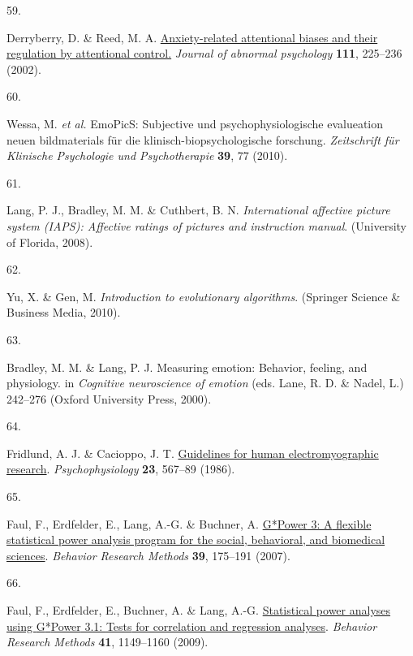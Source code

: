 \documentclass[
  man,floatsintext]{apa6}
\newlength{\cslhangindent}
\newlength{\csllabelwidth}
\newlength{\cslentryspacingunit} %
\newenvironment{CSLReferences}[2] %
 {%
  \setlength{\parindent}{0pt}
  \ifodd #1
  \let\oldpar\par
  \def\par{\hangindent=\cslhangindent\oldpar}
  \fi
  \setlength{\parskip}{#2\cslentryspacingunit}
 }%
 {}
\newcommand{\CSLLeftMargin}[1]{\parbox[t]{\csllabelwidth}{#1}}
\newcommand{\CSLRightInline}[1]{\parbox[t]{\linewidth - \csllabelwidth}{#1}\break}
\begin{document}
\begin{CSLReferences}{0}{0}
\leavevmode{}%
\CSLLeftMargin{59. }%
\CSLRightInline{Derryberry, D. \& Reed, M. A. \href{https://doi.org/10.1037//0021-843X.111.2.225}{Anxiety-related attentional biases and their regulation by attentional control.} \emph{Journal of abnormal psychology} \textbf{111}, 225--236 (2002).}

\leavevmode{}%
\CSLLeftMargin{60. }%
\CSLRightInline{Wessa, M. \emph{et al.} EmoPicS: Subjective und psychophysiologische evalueation neuen bildmaterials für die klinisch-biopsychologische forschung. \emph{Zeitschrift für Klinische Psychologie und Psychotherapie} \textbf{39}, 77 (2010).}

\leavevmode{}%
\CSLLeftMargin{61. }%
\CSLRightInline{Lang, P. J., Bradley, M. M. \& Cuthbert, B. N. \emph{International affective picture system (IAPS): Affective ratings of pictures and instruction manual}. (University of Florida, 2008).}

\leavevmode{}%
\CSLLeftMargin{62. }%
\CSLRightInline{Yu, X. \& Gen, M. \emph{Introduction to evolutionary algorithms}. (Springer Science \& Business Media, 2010).}

\leavevmode{}%
\CSLLeftMargin{63. }%
\CSLRightInline{Bradley, M. M. \& Lang, P. J. Measuring emotion: Behavior, feeling, and physiology. in \emph{Cognitive neuroscience of emotion} (eds. Lane, R. D. \& Nadel, L.) 242--276 (Oxford University Press, 2000).}

\leavevmode{}%
\CSLLeftMargin{64. }%
\CSLRightInline{Fridlund, A. J. \& Cacioppo, J. T. \href{https://doi.org/10.1111/j.1469-8986.1986.tb00676.x}{Guidelines for human electromyographic research}. \emph{Psychophysiology} \textbf{23}, 567--89 (1986).}

\leavevmode{}%
\CSLLeftMargin{65. }%
\CSLRightInline{Faul, F., Erdfelder, E., Lang, A.-G. \& Buchner, A. \href{https://doi.org/10.3758/BF03193146}{G*{Power} 3: {A} flexible statistical power analysis program for the social, behavioral, and biomedical sciences}. \emph{Behavior Research Methods} \textbf{39}, 175--191 (2007).}

\leavevmode{}%
\CSLLeftMargin{66. }%
\CSLRightInline{Faul, F., Erdfelder, E., Buchner, A. \& Lang, A.-G. \href{https://doi.org/10.3758/BRM.41.4.1149}{Statistical power analyses using {G}*{Power} 3.1: {Tests} for correlation and regression analyses}. \emph{Behavior Research Methods} \textbf{41}, 1149--1160 (2009).}


\end{CSLReferences}
\end{document}
